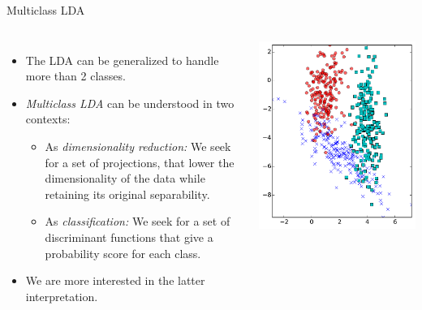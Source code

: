 \documentclass[10pt, aspectratio=169]{beamer} %
\begin{document}
\begin{frame}[fragile,allowframebreaks=0.8]{Multiclass LDA}
\begin{columns}
\begin{itemize}
\item The LDA can be generalized to handle more than 2 classes.
\item \textit{Multiclass LDA} can be understood in two contexts:
\begin{itemize}
\item As \textit{dimensionality reduction:} We seek for a set of projections,
that lower the dimensionality of the data while retaining its original separability.
\item As \textit{classification:} We seek for a set of discriminant functions that 
give a probability score for each class.
\end{itemize}
\item We are more interested in the latter interpretation. 
\end{itemize}
\centerline{\includegraphics[width=\columnwidth]{3Class_LDA.pdf}}
\end{columns}
\end{frame}
\end{document}
